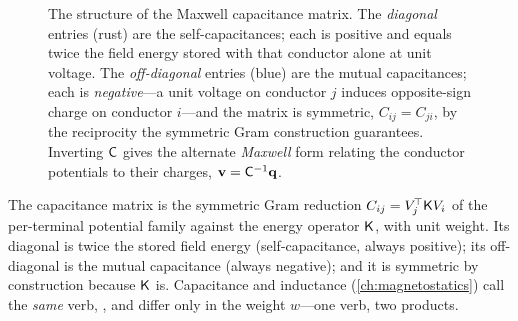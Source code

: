 \begin{figure}[t]
\centering
{}
\caption[Self versus mutual capacitance]{The structure of the Maxwell capacitance
matrix. The \emph{diagonal} entries (rust) are the self-capacitances; each is
positive and equals twice the field energy stored with that conductor alone at unit
voltage. The \emph{off-diagonal} entries (blue) are the mutual capacitances; each is
\emph{negative}---a unit voltage on conductor $j$ induces opposite-sign charge on
conductor $i$---and the matrix is symmetric, $C_{ij}=C_{ji}$, by the reciprocity the
symmetric Gram construction guarantees. Inverting $\mathsf{C}$ gives the alternate
\emph{Maxwell} form relating the conductor potentials to their charges,
$\mathbf v=\mathsf{C}^{-1}\mathbf q$.}
\label{fig:es-selfmutual}
\end{figure}

\begin{keyidea}
The capacitance matrix is the symmetric Gram reduction
$C_{ij}=V_j^{\!\top}\mathsf{K} V_i$ of the per-terminal potential family against the
energy operator $\mathsf{K}$, with unit weight. Its diagonal is twice the stored field
energy (self-capacitance, always positive); its off-diagonal is the mutual
capacitance (always negative); and it is symmetric by construction because $\mathsf{K}$
is. Capacitance and inductance (\cref{ch:magnetostatics}) call the \emph{same}
verb, , and differ only in the weight $w$---one verb, two
products.
\end{keyidea}

